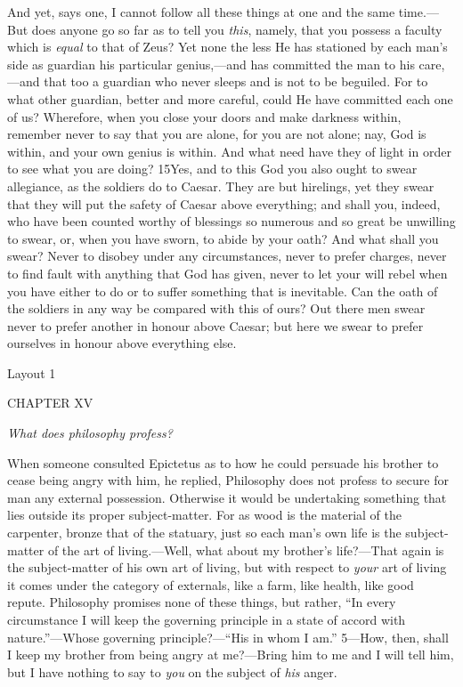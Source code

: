And yet, says one, I cannot follow all these things at one and the same time.—But does anyone go so far as to tell you \emph{this}, namely, that you possess a faculty which is \emph{equal} to that of Zeus? Yet none the less He has stationed by each man's side as guardian his particular genius,—and has committed the man to his care,—and that too a guardian who never sleeps and is not to be beguiled. For to what other guardian, better and more careful, could He have committed each one of us? Wherefore, when you close your doors and make darkness within, remember never to say that you are alone, for you are not alone; nay, God is within, and your own genius is within. And what need have they of light in order to see what you are doing? 15Yes, and to this God you also ought to swear allegiance, as the soldiers do to Caesar. They are but hirelings, yet they swear that they will put the safety of Caesar above everything; and shall you, indeed, who have been counted worthy of blessings so numerous and so great be unwilling to swear, or, when you have sworn, to abide by your oath? And what shall you swear? Never to disobey under any circumstances, never to prefer charges, never to find fault with anything that God has given, never to let your will rebel when you have either to do or to suffer something that is inevitable. Can the oath of the soldiers in any way be compared with this of ours? Out there men swear never to prefer another in honour above Caesar; but here we swear to prefer ourselves in honour above everything else.



Layout 1

CHAPTER XV

\emph{What does philosophy profess?}

When someone consulted Epictetus as to how he could persuade his brother to cease being angry with him, he replied, Philosophy does not profess to secure for man any external possession. Otherwise it would be undertaking something that lies outside its proper subject-matter. For as wood is the material of the carpenter, bronze that of the statuary, just so each man's own life is the subject-matter of the art of living.—Well, what about my brother's life?—That again is the subject-matter of his own art of living, but with respect to \emph{your} art of living it comes under the category of externals, like a farm, like health, like good repute. Philosophy promises none of these things, but rather, ``In every circumstance I will keep the governing principle in a state of accord with nature.''—Whose governing principle?—``His in whom I am.'' 5—How, then, shall I keep my brother from being angry at me?—Bring him to me and I will tell him, but I have nothing to say to \emph{you} on the subject of \emph{his} anger.


